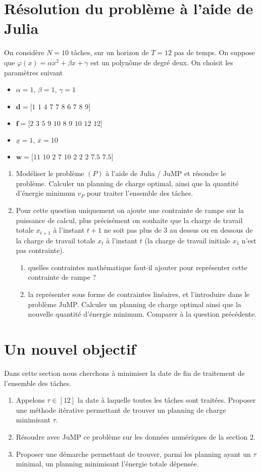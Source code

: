 \documentclass[10pt]{article}
\begin{document}
\section{Résolution du problème à l'aide de Julia}
On considère $N=10$ tâches, sur un horizon de $T=12$ pas de temps. On suppose que $\varphi(x) = \alpha x^2+ \beta x + \gamma $ est un polynôme de degré deux. On choisit les paramètres suivant
\begin{itemize}
	\item $\alpha = 1$, $\beta=1$, $\gamma = 1$
	\item $\mathbf{d}=\textrm{[1 1 4 7 7 8 6 7 8 9]}$
	\item $\mathbf{f}=\textrm{[2 3 5 9 10 8 9 10 12 12]}$
	\item $\underline{x}=1$, $\overline{x} = 10$
	\item $\mathbf{w}=\textrm{[11 10 2 7 10 2 2 2 7.5 7.5]}$
\end{itemize}
\begin{enumerate}[resume]
	\item Modéliser le problème $(P)$ à l'aide de Julia / JuMP et résoudre le problème.
	Calculer un planning de charge optimal, ainsi que la quantité d'énergie minimum $v_P$ pour traiter l'ensemble des tâches.
	\item Pour cette question uniquement on ajoute une contrainte de rampe sur la puissance de calcul, plus précisément on souhaite que la charge de travail totale $x_{t+1}$ à l'instant $t+1$ ne soit pas plus de $3$ au dessus ou en dessous de la charge de travail totale $x_t$ à l'instant $t$ (la charge de travail initiale $x_1$ n'est pas contrainte).
	\begin{enumerate}
		\item quelles contraintes mathématique faut-il ajouter pour représenter cette contrainte de rampe ?
		\item la représenter sous forme de contraintes linéaires, et l'introduire dans le problème JuMP. Calculer un planning de charge optimal ainsi que la nouvelle quantité d'énergie minimum. Comparer à la question précédente.
	\end{enumerate}
\end{enumerate}


\section{Un nouvel objectif}
Dans cette section nous cherchons à minimiser la date de fin de traitement de l'ensemble des tâches.
\begin{enumerate}[resume]
	\item Appelons $\tau \in [12]$ la date à laquelle toutes les tâches sont traitées. Proposer une méthode itérative permettant de trouver un planning de charge minimisant $\tau$.
	\item Résoudre avec JuMP ce problème sur les données numériques de la section $2$.
	\item Proposer une démarche permettant de trouver, parmi les planning ayant un $\tau$ minimal, un planning minimisant l'énergie totale dépensée.
\end{enumerate}
\end{document}
